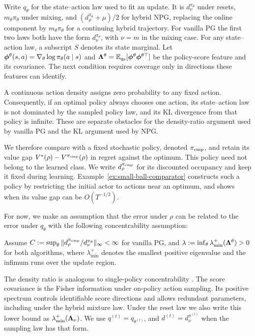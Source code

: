 Write $q_\theta$ for the state--action law used to fit an update. It is $d_\nu^{\pi_\theta}$ under resets, $m_\theta\pi_\theta$ under mixing, and $(d_\rho^{\pi_\theta}+\mu)/2$ for hybrid NPG, replacing the online component by $m_\theta\pi_\theta$ for a continuing hybrid trajectory. For vanilla PG the first two laws both have the form $d_\nu^{\pi_\theta}$, with $\nu=m$ in the mixing case. For any state--action law, a subscript $S$ denotes its state marginal. Let $\boldsymbol{\phi}^\theta(s,a)=\nabla_\theta\log\pi_\theta(a\mid s)$ and $\boldsymbol{\Lambda}^\theta=\mathbb{E}_{q_\theta}[\boldsymbol{\phi}^\theta\boldsymbol{\phi}^{\theta\top}]$ be the policy-score feature and its covariance. The next condition requires coverage only in directions these features can identify.

A continuous action density assigns zero probability to any fixed action. Consequently, if an optimal policy always chooses one action, its state--action law is not dominated by the sampled policy law, and its KL divergence from that policy is infinite. These are separate obstacles for the density-ratio argument used by vanilla PG and the KL argument used by NPG.

We therefore compare with a fixed stochastic policy, denoted $\pi_{\rm cmp}$, and retain its value gap $V^*(\rho)-V^{\pi_{\rm cmp}}(\rho)$ in regret against the optimum. This policy need not belong to the learned class. We write $d_\rho^{\pi_{\rm cmp}}$ for its discounted occupancy and keep it fixed during learning. Example~\ref{ex:small-ball-comparator} constructs such a policy by restricting the initial actor to actions near an optimum, and shows when its value gap can be $O(T^{-1/2})$.

For now, we make an assumption that the error under $\rho$ can be related to the error under $q_\theta$ with the following concentrability assumption:
\begin{aspt}\label{aspt:npg-concentrability}
Assume $C:=\sup_\theta\|d_\rho^{\pi_{\rm cmp}}/d_\nu^{\pi_\theta}\|_\infty<\infty$ for vanilla PG, and $\lambda:=\inf_\theta\lambda_{\min}^+(\boldsymbol{\Lambda}^\theta)>0$ for both algorithms, where $\lambda_{\min}^+$ denotes the smallest positive eigenvalue and the infimum runs over the update region.
\end{aspt}
The density ratio is analogous to single-policy concentrability \citep{xie2022policy}. The score covariance is the Fisher information under on-policy action sampling. Its positive spectrum controls identifiable score directions and allows redundant parameters, including under the hybrid mixture law. Under the reset law we also write this lower bound as $\lambda_{\min}^+(\boldsymbol{\Lambda}_\nu)$. We use $q^{(t)}=q_{\theta^{(t)}}$, and $d^{(t)}=d_\nu^{\pi^{(t)}}$ when the sampling law has that form.

